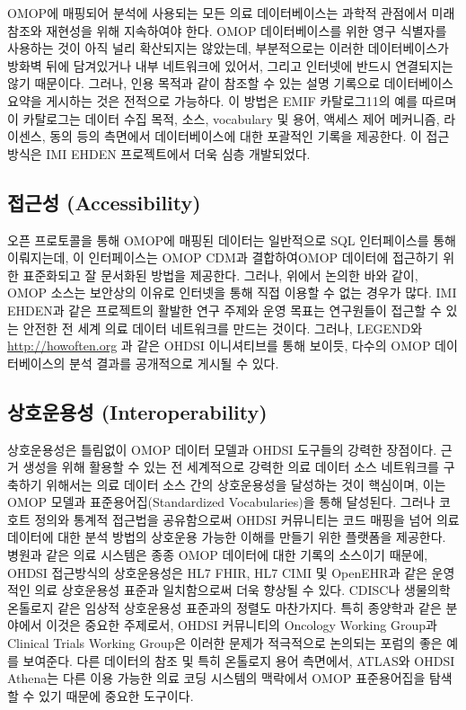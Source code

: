 \documentclass[11pt]{book}
\theoremstyle{definition}
\theoremstyle{definition}
\theoremstyle{definition}
\theoremstyle{remark}
\begin{document}
OMOP에 매핑되어 분석에 사용되는 모든 의료 데이터베이스는 과학적 관점에서
미래 참조와 재현성을 위해 지속하여야 한다. OMOP 데이터베이스를 위한 영구
식별자를 사용하는 것이 아직 널리 확산되지는 않았는데, 부분적으로는
이러한 데이터베이스가 방화벽 뒤에 담겨있거나 내부 네트워크에 있어서,
그리고 인터넷에 반드시 연결되지는 않기 때문이다. 그러나, 인용 목적과
같이 참조할 수 있는 설명 기록으로 데이터베이스 요약을 게시하는 것은
전적으로 가능하다. 이 방법은 EMIF 카탈로그11의 예를 따르며 이 카탈로그는
데이터 수집 목적, 소스, vocabulary 및 용어, 액세스 제어 메커니즘,
라이센스, 동의 등의 측면에서 데이터베이스에 대한 포괄적인 기록을
제공한다. \citep{Oliveira2019} 이 접근 방식은 IMI EHDEN 프로젝트에서
더욱 심층 개발되었다.

\subsection{접근성 (Accessibility)}\label{-accessibility}

오픈 프로토콜을 통해 OMOP에 매핑된 데이터는 일반적으로 SQL 인터페이스를
통해 이뤄지는데, 이 인터페이스는 OMOP CDM과 결합하여OMOP 데이터에
접근하기 위한 표준화되고 잘 문서화된 방법을 제공한다. 그러나, 위에서
논의한 바와 같이, OMOP 소스는 보안상의 이유로 인터넷을 통해 직접 이용할
수 없는 경우가 많다. IMI EHDEN과 같은 프로젝트의 활발한 연구 주제와 운영
목표는 연구원들이 접근할 수 있는 안전한 전 세계 의료 데이터 네트워크를
만드는 것이다. 그러나, LEGEND와 \url{http://howoften.org} 과 같은 OHDSI
이니셔티브를 통해 보이듯, 다수의 OMOP 데이터베이스의 분석 결과를
공개적으로 게시될 수 있다.

\subsection{상호운용성 (Interoperability)}\label{-interoperability}

상호운용성은 틀림없이 OMOP 데이터 모델과 OHDSI 도구들의 강력한 장점이다.
근거 생성을 위해 활용할 수 있는 전 세계적으로 강력한 의료 데이터 소스
네트워크를 구축하기 위해서는 의료 데이터 소스 간의 상호운용성을 달성하는
것이 핵심이며, 이는 OMOP 모델과 표준용어집(Standardized Vocabularies)을
통해 달성된다. 그러나 코호트 정의와 통계적 접근법을 공유함으로써 OHDSI
커뮤니티는 코드 매핑을 넘어 의료 데이터에 대한 분석 방법의 상호운용
가능한 이해를 만들기 위한 플랫폼을 제공한다. 병원과 같은 의료 시스템은
종종 OMOP 데이터에 대한 기록의 소스이기 때문에, OHDSI 접근방식의
상호운용성은 HL7 FHIR, HL7 CIMI 및 OpenEHR과 같은 운영적인 의료
상호운용성 표준과 일치함으로써 더욱 향상될 수 있다. CDISC나 생물의학
온톨로지 같은 임상적 상호운용성 표준과의 정렬도 마찬가지다. 특히
종양학과 같은 분야에서 이것은 중요한 주제로서, OHDSI 커뮤니티의 Oncology
Working Group과 Clinical Trials Working Group은 이러한 문제가 적극적으로
논의되는 포럼의 좋은 예를 보여준다. 다른 데이터의 참조 및 특히 온톨로지
용어 측면에서, ATLAS와 OHDSI Athena는 다른 이용 가능한 의료 코딩
시스템의 맥락에서 OMOP 표준용어집을 탐색할 수 있기 때문에 중요한
도구이다.
\end{document}
